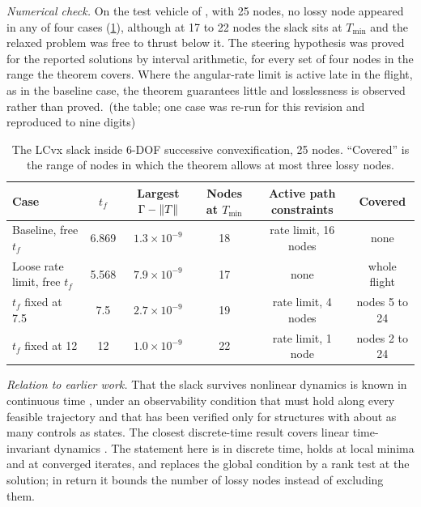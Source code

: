 \emph{Numerical check.} On the test vehicle of \cite{szmuk2020jgcd}, with 25 nodes, no lossy node appeared in any of four cases
(\cref{tab:slack}), although at 17 to 22 nodes the slack sits at $T_{\min}$ and the relaxed problem was free to thrust below it.
The steering hypothesis was proved for the reported solutions by interval arithmetic, for every set of four nodes in the range
the theorem covers. Where the angular-rate limit is active late in the flight, as in the baseline case, the theorem guarantees
little and losslessness is observed rather than proved.\Snum\ (the table; one case was re-run for this revision and reproduced to
nine digits)

\begin{table}[t]\centering\small
\caption{The LCvx slack inside 6-DOF successive convexification, 25 nodes. ``Covered''
is the range of nodes in which the theorem allows at most three lossy nodes.}\label{tab:slack}
\begin{tabular}{@{}lccccc@{}}\toprule
Case & $t_f$ & Largest $\Gamma-\lVert T\rVert$ & Nodes at $T_{\min}$ & Active path constraints & Covered \\\midrule
Baseline, free $t_f$ & 6.869 & $1.3\times10^{-9}$ & 18 & rate limit, 16 nodes & none \\
Loose rate limit, free $t_f$ & 5.568 & $7.9\times10^{-9}$ & 17 & none & whole flight \\
$t_f$ fixed at 7.5 & 7.5 & $2.7\times10^{-9}$ & 19 & rate limit, 4 nodes & nodes 5 to 24 \\
$t_f$ fixed at 12 & 12 & $1.0\times10^{-9}$ & 22 & rate limit, 1 node & nodes 2 to 24 \\\bottomrule
\end{tabular}
\end{table}

\emph{Relation to earlier work.} That the slack survives nonlinear dynamics is known in continuous time
\cite{blackmore2012scl}, under an observability condition that must hold along every feasible trajectory and that has been
verified only for structures with about as many controls as states. The closest discrete-time result covers linear
time-invariant dynamics \cite{luo2026automatica}. The statement here is in discrete time, holds at local minima and at converged
iterates, and replaces the global condition by a rank test at the solution; in return it bounds the number of lossy nodes
instead of excluding them.

